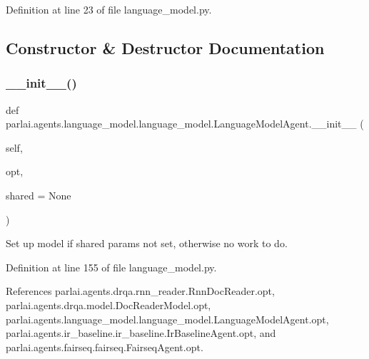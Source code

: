 Definition at line 23 of file language\+\_\+model.\+py.



\subsection{Constructor \& Destructor Documentation}
\mbox{\label{classparlai_1_1agents_1_1language__model_1_1language__model_1_1LanguageModelAgent_ae2277cc7020d5aeae4b53e195842c379}} 
\subsubsection{\texorpdfstring{\+\_\+\+\_\+init\+\_\+\+\_\+()}{\_\_init\_\_()}}
{\footnotesize\ttfamily def parlai.\+agents.\+language\+\_\+model.\+language\+\_\+model.\+Language\+Model\+Agent.\+\_\+\+\_\+init\+\_\+\+\_\+ (\begin{DoxyParamCaption}\item[{}]{self,  }\item[{}]{opt,  }\item[{}]{shared = {\ttfamily None} }\end{DoxyParamCaption})}

\begin{DoxyVerb}Set up model if shared params not set, otherwise no work to do.\end{DoxyVerb}
 

Definition at line 155 of file language\+\_\+model.\+py.



References parlai.\+agents.\+drqa.\+rnn\+\_\+reader.\+Rnn\+Doc\+Reader.\+opt, parlai.\+agents.\+drqa.\+model.\+Doc\+Reader\+Model.\+opt, parlai.\+agents.\+language\+\_\+model.\+language\+\_\+model.\+Language\+Model\+Agent.\+opt, parlai.\+agents.\+ir\+\_\+baseline.\+ir\+\_\+baseline.\+Ir\+Baseline\+Agent.\+opt, and parlai.\+agents.\+fairseq.\+fairseq.\+Fairseq\+Agent.\+opt.



